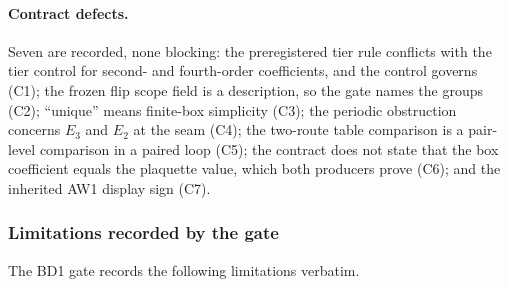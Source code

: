 \paragraph{Contract defects.} Seven are recorded, none blocking: the
preregistered tier rule conflicts with the tier control for second- and
fourth-order coefficients, and the control governs (C1); the frozen flip
scope field is a description, so the gate names the groups (C2); ``unique''
means finite-box simplicity (C3); the periodic obstruction concerns $E_3$ and
$E_2$ at the seam (C4); the two-route table comparison is a pair-level
comparison in a paired loop (C5); the contract does not state that the box
coefficient equals the plaquette value, which both producers prove (C6); and
the inherited AW1 display sign (C7).

\subsubsection{Limitations recorded by the gate}
\label{sec:bd1-limits}
The BD1 gate records the following limitations verbatim.
